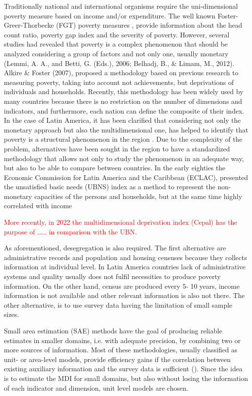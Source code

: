 \documentclass[a4paper, 11pt]{article}
\begin{document}
Traditionally national and international organisms require the uni-dimensional poverty measure based on income and/or expenditure. The well known Foster-Greer-Thorbecke (FGT) poverty measures \citep{foster1984}, provide information about the head count ratio, poverty gap index and the severity of poverty. However, several studies had revealed that poverty is a complex phenomenon that should be analyzed considering a group of factors and not only one, usually monetary (Lemmi, A. A., and Betti, G. (Eds.), 2006; Belhadj, B., & Limam, M., 2012). Alkire & Foster (2007), proposed a methodology based on previous research to measuring poverty, taking into account not achievements, but deprivations of individuals and households. Recently, this methodology has been widely used by many countries because there is no restriction on the number of dimensions and indicators, and furthermore, each nation can define the composite of their index.
In the case of Latin America, it has been clarified that  considering not only the monetary approach but also the multidimensional one, has helped to identify that poverty is a structural phenomenon in the region \citep{CEPAL2014}. Due to the complexity of the problem, alternatives have been sought in the region to have a standardized methodology that allows not only to study the phenomenon in an adequate way, but also to be able to compare between countries. In the early eighties the Economic Commission for Latin America and the Caribbean (ECLAC), presented the unsatisfied basic needs (UBNS) index as a method to represent the non-monetary capacities of the persons and households, but at the same time highly correlated with income \citep{Mancero2001}

\textcolor{red}{More recently, in 2022 the multidimensional deprivation index (Cepal) has the purpose of ..... in comparison with the UBN.} 

As aforementioned, desegregation is also required. The first alternative are administrative records and population and housing censuses because they collects information at individual level. In Latin America countries lack of administrative systems and quality usually does not fulfil necessities to produce poverty information. On the other hand, census are produced every 5- 10 years, income information is not available and other relevant information is also not there. The other alternative, is to use survey data having the limitation of small sample sizes. 

Small area estimation (SAE) methods have the goal of producing reliable estimates in smaller domains, i.e. with adequate precision, by combining two or more sources of information. Most of these methodologies, usually classified as unit- or area-level models, provide efficiency gains if the correlation between existing auxiliary information and the survey data is sufficient (\citealt{Pfeffermann2013, Rao2015,  Pratesi2016, tzavidis2018start}).  Since the idea is to estimate the MDI for small domains, but also without losing the information of each indicator and dimension, unit level models are chosen. 
\end{document}
